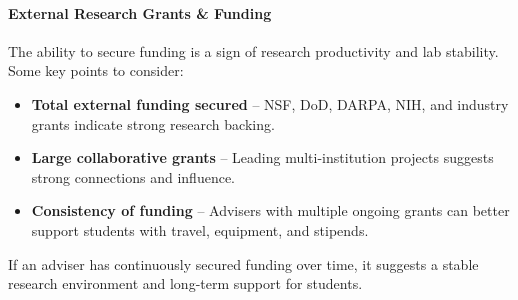 \documentclass[oneside,11pt,dvipsnames]{book}
\begin{document}

\paragraph{External Research Grants \& Funding}
The ability to secure funding is a sign of research productivity and lab stability. Some key points to consider:
\begin{itemize}
    \item \textbf{Total external funding secured} – NSF, DoD, DARPA, NIH, and industry grants indicate strong research backing.
    \item \textbf{Large collaborative grants} – Leading multi-institution projects suggests strong connections and influence.
    \item \textbf{Consistency of funding} – Advisers with multiple ongoing grants can better support students with travel, equipment, and stipends.
\end{itemize}
If an adviser has continuously secured funding over time, it suggests a stable research environment and long-term support for students.
\end{document}
